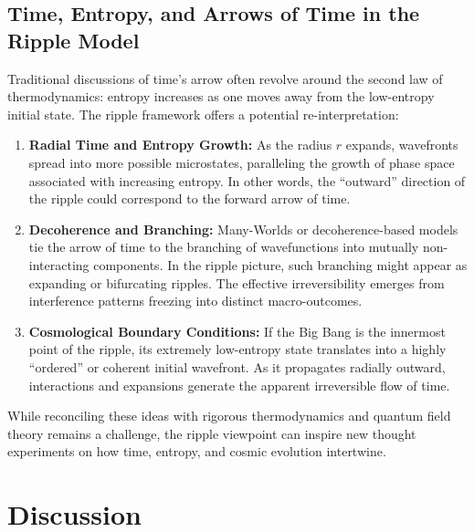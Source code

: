 \documentclass[11pt]{article}
\begin{document}
\subsection{Time, Entropy, and Arrows of Time in the Ripple Model}
\label{subsec:time-entropy}
Traditional discussions of time’s arrow often revolve around the second 
law of thermodynamics: entropy increases as one moves away from the low-entropy 
initial state. The ripple framework offers a potential re-interpretation:
\begin{enumerate}
  \item \textbf{Radial Time and Entropy Growth:} As the radius \(r\) 
        expands, wavefronts spread into more possible microstates, 
        paralleling the growth of phase space associated with increasing 
        entropy. In other words, the “outward” direction of the ripple 
        could correspond to the forward arrow of time.
  \item \textbf{Decoherence and Branching:} Many-Worlds or decoherence-based 
        models tie the arrow of time to the branching of wavefunctions into 
        mutually non-interacting components. In the ripple picture, such 
        branching might appear as expanding or bifurcating ripples. The 
        effective irreversibility emerges from interference patterns 
        freezing into distinct macro-outcomes.
  \item \textbf{Cosmological Boundary Conditions:} If the Big Bang is the 
        innermost point of the ripple, its extremely low-entropy state 
        translates into a highly “ordered” or coherent initial wavefront. 
        As it propagates radially outward, interactions and expansions 
        generate the apparent irreversible flow of time.
\end{enumerate}
While reconciling these ideas with rigorous thermodynamics and quantum 
field theory remains a challenge, the ripple viewpoint can inspire new 
thought experiments on how time, entropy, and cosmic evolution intertwine.


\section{Discussion}
\label{sec:discussion}
\end{document}
